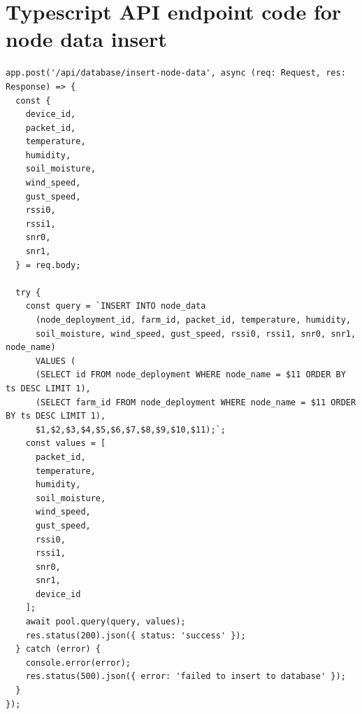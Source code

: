 \section{Typescript API endpoint code for node data
insert}\label{app:api-endpoint}
\begin{multicols}{2}
\begin{lstlisting}
app.post('/api/database/insert-node-data', async (req: Request, res: Response) => {
  const {
    device_id,
    packet_id,
    temperature,
    humidity,
    soil_moisture,
    wind_speed,
    gust_speed,
    rssi0,
    rssi1,
    snr0,
    snr1,
  } = req.body;

  try {
    const query = `INSERT INTO node_data 
      (node_deployment_id, farm_id, packet_id, temperature, humidity, 
      soil_moisture, wind_speed, gust_speed, rssi0, rssi1, snr0, snr1, node_name)
      VALUES (
      (SELECT id FROM node_deployment WHERE node_name = $11 ORDER BY ts DESC LIMIT 1),
      (SELECT farm_id FROM node_deployment WHERE node_name = $11 ORDER BY ts DESC LIMIT 1),
      $1,$2,$3,$4,$5,$6,$7,$8,$9,$10,$11);`;
    const values = [
      packet_id,
      temperature,
      humidity,
      soil_moisture,
      wind_speed,
      gust_speed,
      rssi0,
      rssi1,
      snr0,
      snr1,
      device_id
    ];
    await pool.query(query, values);
    res.status(200).json({ status: 'success' });
  } catch (error) {
    console.error(error);
    res.status(500).json({ error: 'failed to insert to database' });
  }
});
\end{lstlisting}
\end{multicols}

